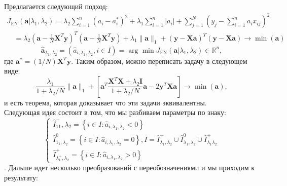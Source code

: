 \documentclass[12pt, twoside]{article}
\begin{document}
Предлагается следующий подход:
\begin{equation}
\begin{array}{l}{J_{\mathrm{EN}}\left(\mathbf{a} | \lambda_{1}, \lambda_{2}\right)=\lambda_{2} \sum_{i=1}^{n}\left(a_{i}-a_{i}^{*}\right)^{2}+\lambda_{1} \sum_{i=1}^{n}\left|a_{i}\right|+\sum_{j=1}^{N}\left(y_{j}-\sum_{i=1}^{n} a_{i} x_{i j}\right)^{2}} \\ {\quad=\lambda_{2}\left(\mathbf{a}-\frac{1}{N} \mathbf{X}^{T} \mathbf{y}\right)^{T}\left(\mathbf{a}-\frac{1}{N} \mathbf{X}^{T} \mathbf{y}\right)+\lambda_{1}\|\mathbf{a}\|_{1}+(\mathbf{y}-\mathbf{X} \mathbf{a})^{T}(\mathbf{y}-\mathbf{X} \mathbf{a}) \rightarrow \min (\mathbf{a})}\end{array}
\end{equation}
\begin{equation}
\hat{\mathbf{a}}_{\lambda_{1}, \lambda_{2}}=\left(\hat{a}_{i, \lambda_{1}, \lambda_{2}}, i \in I\right)=\arg \min J_{\mathrm{EN}}\left(\mathbf{a} | \lambda_{1}, \lambda_{2}\right) \in \mathbb{R}^{n},
\end{equation}
где $\mathbf{a}^{*}=(1 / N) \mathbf{X}^{T} \mathbf{y}$. Таким образом, можно переписать задачу в следующем виде:
\begin{equation}
\frac{\lambda_{1}}{1+\lambda_{2} / N}\|\mathbf{a}\|_{1}+\left[\mathbf{a}^{T} \frac{\mathbf{X}^{T} \mathbf{X}+\lambda_{2} \mathbf{I}}{1+\lambda_{2} / N} \mathbf{a}-2 \mathbf{y}^{T} \mathbf{X} \mathbf{a}\right] \rightarrow \min (\mathbf{a}),
\end{equation}
и есть теорема, которая доказывает что эти задачи эквивалентны.\\
Следующая идея состоит в том, что мы разбиваем параметры по знаку:
\begin{equation}
\left\{\begin{array}{l}
{\hat{I}_{11}^{-}, \lambda_{2}=\left\{i \in I: \hat{a}_{i, \lambda_{1}, \lambda_{2}}<0\right\}} \\
{\hat{I}_{1_{1}, \lambda_{2}}^{0}=\left\{i \in I: \hat{a}_{i, \lambda_{1}, \lambda_{2}}=0\right\}, I=\hat{I}_{\lambda_{1}, \lambda_{2}}^{-} \cup \hat{I}_{\lambda_{1}, \lambda_{2}}^{0} \cup \hat{I}_{\lambda_{1} \lambda_{2}}^{+}} \\
{\hat{I}_{\lambda_{1}^{+}, \lambda_{2}}^{+}=\left\{i \in I: \hat{a}_{i, \lambda_{1}, \lambda_{2}}>0\right\}}
\end{array}\right.
\end{equation}.
Дальше идет несколько преобразований с переобозначениями и мы приходим к результату:
\end{document}
